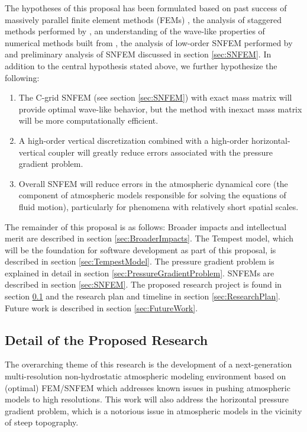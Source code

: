 \documentclass[11pt]{article}
\begin{document}
The hypotheses of this proposal has been formulated based on past success of massively parallel finite element methods (FEMs) \citep{JDJEKJEONGetal2011IJHPCA}, the analysis of staggered methods performed by \cite{JTTJW2005JCP}, an understanding of the wave-like properties of numerical methods built from \cite{PAUCJ2011JCP}, the analysis of low-order SNFEM performed by \cite{CJCJS2012JCP} and preliminary analysis of SNFEM discussed in section \ref{sec:SNFEM}.  In addition to the central hypothesis stated above, we further hypothesize the following: 
\vspace{-0.4cm}
\begin{enumerate}
\item The C-grid SNFEM (see section \ref{sec:SNFEM}) with exact mass matrix will provide optimal wave-like behavior, but the method with inexact mass matrix will be more computationally efficient.

\item A high-order vertical discretization combined with a high-order horizontal-vertical coupler will greatly reduce errors associated with the pressure gradient problem.

\item Overall SNFEM will reduce errors in the atmospheric dynamical core (the component of atmospheric models responsible for solving the equations of fluid motion), particularly for phenomena with relatively short spatial scales.
\end{enumerate}
\vspace{-0.4cm}
The remainder of this proposal is as follows:  Broader impacts and intellectual merit are described in section \ref{sec:BroaderImpacts}.  The Tempest model, which will be the foundation for software development as part of this proposal, is described in section \ref{sec:TempestModel}.  The pressure gradient problem is explained in detail in section \ref{sec:PressureGradientProblem}.  SNFEMs are described in section \ref{sec:SNFEM}.  The proposed research project is found in section \ref{sec:Research} and the research plan and timeline in section \ref{sec:ResearchPlan}.  Future work is described in section \ref{sec:FutureWork}.

\subsection{Detail of the Proposed Research} \label{sec:Research}

The overarching theme of this research is the development of a next-generation multi-resolution non-hydrostatic atmospheric modeling environment based on (optimal) FEM/SNFEM which addresses known issues in pushing atmospheric models to high resolutions.  This work will also address the horizontal pressure gradient problem, which is a notorious issue in atmospheric models in the vicinity of steep topography.
\end{document}
